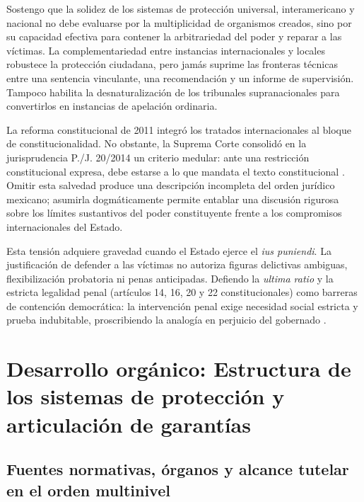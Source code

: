 \documentclass[12pt,spanish,letterpaper,oneside]{article}
\begin{document}
Sostengo que la solidez de los sistemas de protecci\'on universal, interamericano y nacional no debe evaluarse por la multiplicidad de organismos creados, sino por su capacidad efectiva para contener la arbitrariedad del poder y reparar a las v\'ictimas. La complementariedad entre instancias internacionales y locales robustece la protecci\'on ciudadana, pero jam\'as suprime las fronteras t\'ecnicas entre una sentencia vinculante, una recomendaci\'on y un informe de supervisi\'on. Tampoco habilita la desnaturalizaci\'on de los tribunales supranacionales para convertirlos en instancias de apelaci\'on ordinaria.

La reforma constitucional de 2011 integr\'o los tratados internacionales al bloque de constitucionalidad. No obstante, la Suprema Corte consolid\'o en la jurisprudencia P./J. 20/2014 un criterio medular: ante una restricci\'on constitucional expresa, debe estarse a lo que mandata el texto constitucional \citep{scjnParametro2014ADH}. Omitir esta salvedad produce una descripci\'on incompleta del orden jur\'idico mexicano; asumirla dogm\'aticamente permite entablar una discusi\'on rigurosa sobre los l\'imites sustantivos del poder constituyente frente a los compromisos internacionales del Estado.

Esta tensi\'on adquiere gravedad cuando el Estado ejerce el \emph{ius puniendi}. La justificaci\'on de defender a las v\'ictimas no autoriza figuras delictivas ambiguas, flexibilizaci\'on probatoria ni penas anticipadas. Defiendo la \emph{ultima ratio} y la estricta legalidad penal (art\'iculos 14, 16, 20 y 22 constitucionales) como barreras de contenci\'on democr\'atica: la intervenci\'on penal exige necesidad social estricta y prueba indubitable, proscribiendo la analog\'ia en perjuicio del gobernado \citep{cpeumADH2026,onuPactoDerechosCivilesPoliticos1966}.

\clearpage
\section[Sistemas de protecci\'on y garant\'ias]{Desarrollo org\'anico: Estructura de los sistemas de protecci\'on y articulaci\'on de garant\'ias}

\subsection{Fuentes normativas, \'organos y alcance tutelar en el orden multinivel}
\end{document}
